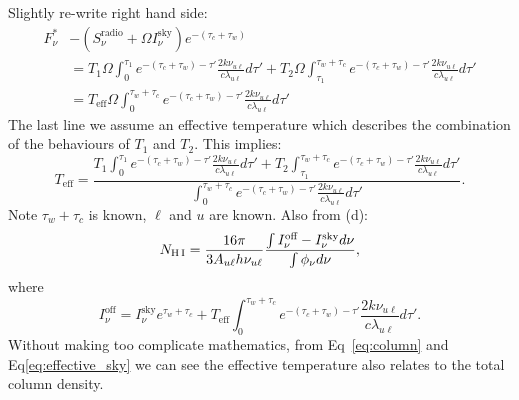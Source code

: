 \documentclass[12pt,letterpaper]{article}
\newcommand{\hi}{\textrm{H\,I}}
\newcommand{\Isky}{I_\nu^{\textrm{sky}}}
\newcommand{\Snuradio}{S_\nu^{\textrm{radio}}}
\begin{document}
Slightly re-write right hand side:
\begin{equation*}
    \begin{split}
        F_\nu^{*} &- (\Snuradio + \Omega\Isky)e^{-(\tau_c + \tau_w)}\\
        &= 
        T_{1}\Omega\int_0^{\tau_1} e^{-(\tau_c + \tau_w) - \tau'} 
        \frac{2 k \nu_{u \ell}}{c \lambda_{u \ell}} d\tau'
        + 
        T_{2} \Omega\int_{\tau_1}^{\tau_w + \tau_c} e^{-(\tau_c + \tau_w) - \tau'} 
        \frac{2 k  \nu_{u \ell}}{c \lambda_{u \ell}} d\tau'\\
        &=
        T_{\textrm{eff}}\Omega\int_0^{\tau_w + \tau_c} e^{-(\tau_c + \tau_w) - \tau'} 
        \frac{2 k \nu_{u \ell}}{c \lambda_{u \ell}} d\tau'
    \end{split}
\end{equation*}
The last line we assume an effective temperature which describes the combination of the behaviours of $T_1$ and $T_2$.
This implies:
\begin{equation}
    T_\textrm{eff}
    = \frac{T_{1}\int_0^{\tau_1} e^{-(\tau_c + \tau_w) - \tau'} 
    \frac{2 k \nu_{u \ell}}{c \lambda_{u \ell}} d\tau'
    +
    T_{2} \int_{\tau_1}^{\tau_w + \tau_c} e^{-(\tau_c + \tau_w) - \tau'} 
        \frac{2 k  \nu_{u \ell}}{c \lambda_{u \ell}} d\tau'}{
            \int_0^{\tau_w + \tau_c} e^{-(\tau_c + \tau_w) - \tau'} 
        \frac{2 k \nu_{u \ell}}{c \lambda_{u \ell}} d\tau'
        }.
\end{equation}
Note $\tau_w + \tau_c$ is known, $\ell$ and $u$ are known.
Also from (d):
\begin{equation}
    N_{\hi} = \frac{16 \pi}{3 A_{u\ell} h \nu_{u \ell}} \frac{\int I_\nu^{\textrm{off}} - \Isky d\nu}{ \int \phi_\nu d\nu },
    \label{eq:column}
\end{equation}
where
\begin{equation}
    I_\nu^{\textrm{off}}
    =
    \Isky e^{\tau_w + \tau_c} +
     T_{\textrm{eff}}\int_0^{\tau_w + \tau_c} e^{-(\tau_c + \tau_w) - \tau'} 
    \frac{2 k \nu_{u \ell}}{c \lambda_{u \ell}} d\tau'.
    \label{eq:effective_sky}
\end{equation}
Without making too complicate mathematics, from Eq~\ref{eq:column} and Eq\ref{eq:effective_sky} we can see the effective temperature also relates to the total column density.
\end{document}

